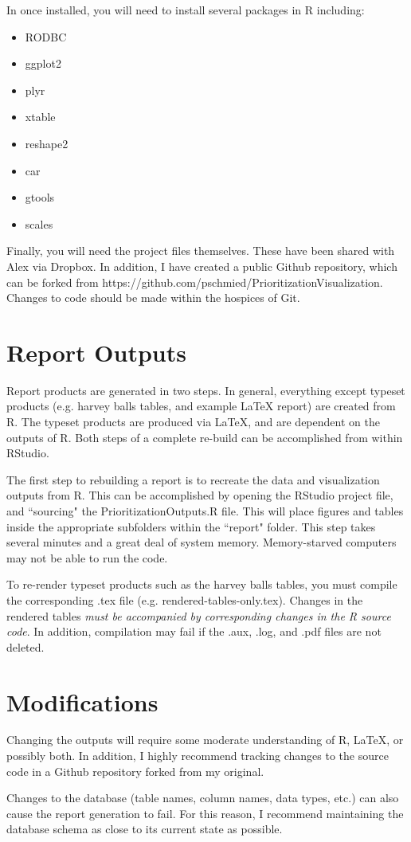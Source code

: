 \documentclass[10pt, letterpaper, final, twoside, onecolumn, article]{memoir}%
\begin{document}
In once installed, you will need to install several packages in R including:
\begin{itemize}
\item RODBC
\item ggplot2
\item plyr
\item xtable
\item reshape2
\item car
\item gtools
\item scales
\end{itemize}

Finally, you will need the project files themselves. These have been shared with Alex via Dropbox. In addition, I have created a public Github repository, which can be forked from https://github.com/pschmied/PrioritizationVisualization. Changes to code should be made within the hospices of Git.

\chapter{Report Outputs}
Report products are generated in two steps. In general, everything except typeset products (e.g. harvey balls tables, and example LaTeX report) are created from R. The typeset products are produced via LaTeX, and are dependent on the outputs of R. Both steps of a complete re-build can be accomplished from within RStudio.

The first step to rebuilding a report is to recreate the data and visualization outputs from R. This can be accomplished by opening the RStudio project file, and ``sourcing" the PrioritizationOutputs.R file. This will place figures and tables inside the appropriate subfolders within the ``report" folder. This step takes several minutes and a great deal of system memory. Memory-starved computers may not be able to run the code.

To re-render typeset products such as the harvey balls tables, you must compile the corresponding .tex file (e.g. rendered-tables-only.tex). Changes in the rendered tables \emph{must be accompanied by corresponding changes in the R source code}. In addition, compilation may fail if the .aux, .log, and .pdf files are not deleted.

\chapter{Modifications}
Changing the outputs will require some moderate understanding of R, LaTeX, or possibly both. In addition, I highly recommend tracking changes to the source code in a Github repository forked from my original.

Changes to the database (table names, column names, data types, etc.) can also cause the report generation to fail. For this reason, I recommend maintaining the database schema as close to its current state as possible.
\end{document}
